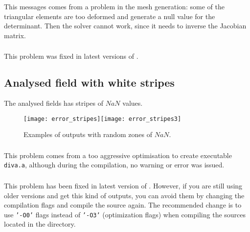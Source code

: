 \subsubsection{\question}

This messages comes from a problem in the mesh generation: some of the triangular elements are too deformed and generate a null value for the determinant. Then the solver cannot work, since it needs to inverse the Jacobian matrix.


\subsubsection{\answer}

This problem was fixed in latest versions of \diva. 



\subsection{Analysed field with white stripes}

The analysed fields has stripes of $NaN$ values.

\begin{figure}[htpb]
\centering
\texttt{[image: error\_stripes]}\texttt{[image: error\_stripes3]}
\caption{Examples of \diva outputs with random zones of $NaN$.\label{fig:error_stripes2}}
\end{figure}

\subsubsection{\question}

This problem comes from a too aggressive optimisation to create executable \texttt{diva.a}, although during the compilation, no warning or error was issued.  

\subsubsection{\answer}

This problem has been fixed in latest version of \diva. However, if you are still using older versions and get this kind of outputs, you can avoid them by changing the compilation flags and compile the source again. The recommended change is to use \texttt{'-O0'} flags instead of \texttt{'-O3'} (optimization flags) when compiling the sources located in the  directory.


